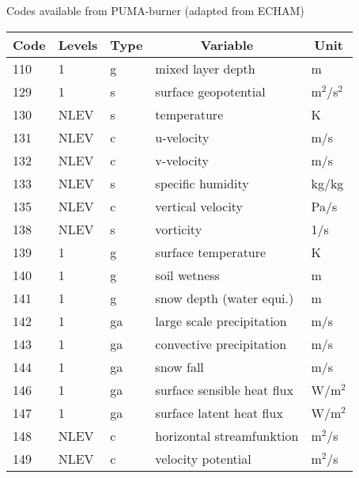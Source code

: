 \documentclass[a4paper,12pt]{article}
\begin{document}
\begin{table}[t]
Codes available from PUMA-burner (adapted from ECHAM) \\

\begin{tabular}[t]{|l|l|l|l|l|} \hline
\multicolumn{1}{|c|}{Code} &
\multicolumn{1}{c|}{Levels}&
\multicolumn{1}{c|}{Type} &
\multicolumn{1}{c|}{Variable} &
\multicolumn{1}{c|}{Unit} \\ \hline \hline

110 & 1    & g  & mixed layer depth                & m               \\ \hline
129 & 1    & s  & surface geopotential             & m$^{2}$/s$^{2}$ \\ \hline
130 & NLEV & s  & temperature                      & K               \\ \hline
131 & NLEV & c  & u-velocity                       & m/s             \\ \hline
132 & NLEV & c  & v-velocity                       & m/s             \\ \hline
133 & NLEV & s  & specific humidity                & kg/kg           \\ \hline
135 & NLEV & c  & vertical velocity                & Pa/s            \\ \hline
138 & NLEV & s  & vorticity                        & 1/s             \\ \hline
139 & 1    & g  & surface temperature              & K               \\ \hline
140 & 1    & g  & soil wetness                     & m               \\ \hline
141 & 1    & g  & snow depth (water equi.)         & m               \\ \hline
142 & 1    & ga & large scale precipitation        & m/s             \\ \hline
143 & 1    & ga & convective precipitation         & m/s             \\ \hline
144 & 1    & ga & snow fall                        & m/s             \\ \hline
146 & 1    & ga & surface sensible heat flux       & W/m$^{2}$       \\ \hline
147 & 1    & ga & surface latent heat flux         & W/m$^{2}$       \\ \hline
148 & NLEV & c  & horizontal streamfunktion        & m$^{2}$/s       \\ \hline
149 & NLEV & c  & velocity potential               & m$^{2}$/s       \\ \hline

\end{tabular}
\end{table}
\end{document}
